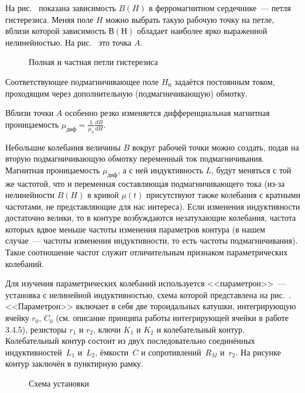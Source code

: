 На рис.~ показана зависимость $B(H)$ в ферромагнитном
сердечнике~--- петля гистерезиса. Меняя поле $H$ можно выбрать такую рабочую
точку на петле, вблизи которой зависимость $В(Н)$ обладает наиболее ярко
выраженной нелинейностью. На рис.~ это точка $A$.

\begin{figure}[h!]
\centering
	\caption{Полная и частная петли гистерезиса}
\end{figure}

Соответствующее подмагничивающее поле $H_\text{п}$ задаётся постоянным током,
проходящим через дополнительную (подмагничивающую) обмотку.

Вблизи точки $A$ особенно резко изменяется дифференциальная магнитная
проницаемость $\mu_\text{диф} = \frac{1}{\mu_0}\frac{dB}{dH}$.

Небольшие колебания величины $B$ вокруг рабочей точки можно создать, подав на
вторую подмагничивающую обмотку переменный ток подмагничивания. Магнитная
проницаемость $\mu_\text{диф}$, а с ней индуктивность $L$, будут меняться с той
же частотой, что и переменная составляющая подмагничивающего тока (из-за
нелинейности $B(H)$ в кривой $\mu(t)$ присутствуют также колебания с кратными
частотами, не представляющие для нас интереса). Если изменения индуктивности
достаточно велики, то в контуре возбуждаются незатухающие колебания, частота
которых вдвое меньше частоты изменения параметров контура (в нашем случае~---
частоты изменения индуктивности, то есть частоты подмагничивания). Такое
соотношение частот служит отличительным признаком параметрических колебаний.

\experiment
Для изучения параметрических колебаний используется <<параметрон>>~--- установка
с нелинейной индуктивностью, схема которой представлена на
рис.~. <<Параметрон>> включает в себя две
тороидальных катушки, интегрирующую ячейку $r_0$, $C_0$ (см. описание
принципа работы интегрирующей ячейки в работе 3.4.5),
резисторы $r_1$ и $r_2$, ключи $K_1$ и $K_2$ и колебательный контур.
Колебательный контур состоит из двух последовательно соединённых
индуктивностей~$L_1$ и~$L_2$, ёмкости~$C$ и сопротивлений~$R_M$ и~$r_2$.
На рисунке контур заключён в пунктирную рамку.
\begin{figure}[h!]
\centering
	\caption{Схема установки}
\end{figure}

